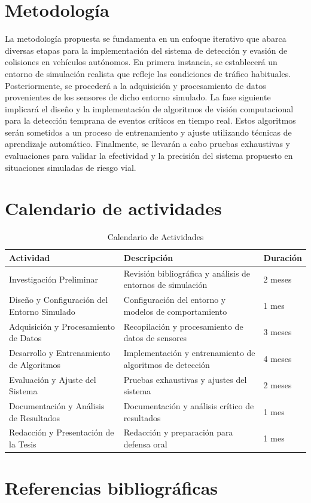 \documentclass[10pt,letterpaper,final]{article}
\begin{document}
    \section*{Metodología}
    \noindent La metodología propuesta se fundamenta en un enfoque iterativo que abarca diversas etapas para la implementación del sistema de detección
    y evasión de colisiones en vehículos autónomos. En primera instancia, se establecerá un entorno de simulación realista que refleje las condiciones de tráfico habituales.
    Posteriormente, se procederá a la adquisición y procesamiento de datos provenientes de los sensores de dicho entorno simulado. La fase siguiente implicará el diseño
    y la implementación de algoritmos de visión computacional para la detección temprana de eventos críticos en tiempo real. Estos algoritmos serán sometidos a un proceso
    de entrenamiento y ajuste utilizando técnicas de aprendizaje automático. Finalmente, se llevarán a cabo pruebas exhaustivas y evaluaciones para validar la efectividad
    y la precisión del sistema propuesto en situaciones simuladas de riesgo vial.
    \section*{Calendario de actividades}
    \begin{table}[htbp]
        \centering
        \caption{Calendario de Actividades}
        \begin{tabular}{|>{\raggedright\arraybackslash}p{4cm}|p{6cm}|p{3cm}|}
            \hline
            \textbf{Actividad}                          & \textbf{Descripción}                                        & \textbf{Duración} \\ \hline
            Investigación Preliminar                    & Revisión bibliográfica y análisis de entornos de simulación & 2 meses \\ \hline
            Diseño y Configuración del Entorno Simulado & Configuración del entorno y modelos de comportamiento & 1 mes \\ \hline
            Adquisición y Procesamiento de Datos        & Recopilación y procesamiento de datos de sensores & 3 meses \\ \hline
            Desarrollo y Entrenamiento de Algoritmos    & Implementación y entrenamiento de algoritmos de detección & 4 meses \\ \hline
            Evaluación y Ajuste del Sistema             & Pruebas exhaustivas y ajustes del sistema                   & 2 meses           \\ \hline
            Documentación y Análisis de Resultados      & Documentación y análisis crítico de resultados & 1 mes \\ \hline
            Redacción y Presentación de la Tesis        & Redacción y preparación para defensa oral                   & 1 mes             \\ \hline
        \end{tabular}
    \end{table}
    \clearpage
    \section*{Referencias bibliográficas}
    
    
\end{document}
